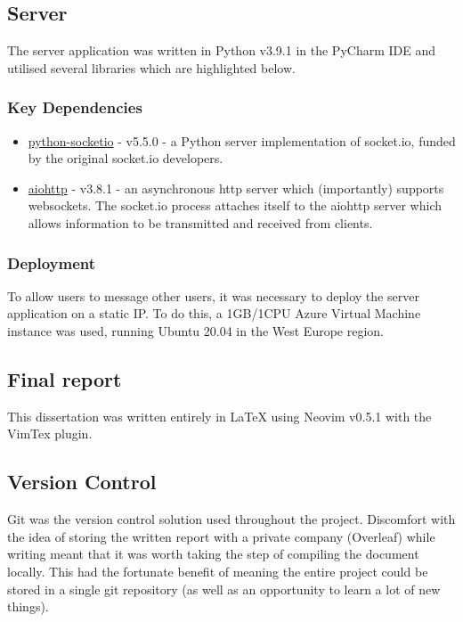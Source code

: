 \documentclass{mproj}
\begin{document}
\subsection{Server}
The server application was written in Python v3.9.1 in the PyCharm IDE and utilised several libraries which are highlighted below. 

\subsubsection{Key Dependencies}
\begin{itemize}
	\item \href{https://python-socketio.readthedocs.io/en/latest/index.html}{python-socketio} - v5.5.0 - a Python server implementation of socket.io, funded by the original socket.io developers.
	\item \href{https://docs.aiohttp.org/en/stable/}{aiohttp} - v3.8.1 - an asynchronous http server which (importantly) supports websockets. The socket.io process attaches itself to the aiohttp server which allows information to be transmitted and received from clients.
\end{itemize}

\subsubsection{Deployment}
To allow users to message other users, it was necessary to deploy the server application on a static IP. To do this, a 1GB/1CPU Azure Virtual Machine instance was used, running Ubuntu 20.04 in the West Europe region. 

\subsection{Final report}
This dissertation was written entirely in LaTeX using Neovim v0.5.1 with the VimTex plugin. 

\subsection{Version Control}
Git was the version control solution used throughout the project. Discomfort with the idea of storing the written report with a private company (Overleaf) while writing meant that it was worth taking the step of compiling the document locally. This had the fortunate benefit of meaning the entire project could be stored in a single git repository (as well as an opportunity to learn a lot of new things). 
\end{document}
